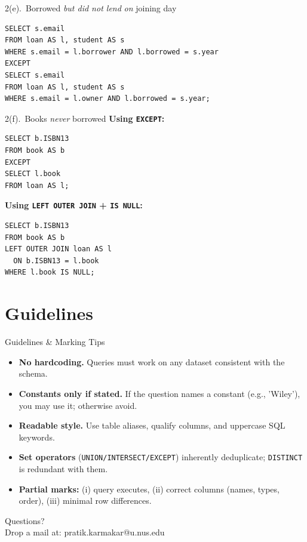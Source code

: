 \documentclass{beamer}
\begin{document}
\begin{frame}[fragile]{2(e).\ Borrowed \emph{but did not lend} \emph{on} joining day}
\small
\begin{lstlisting}
SELECT s.email
FROM loan AS l, student AS s
WHERE s.email = l.borrower AND l.borrowed = s.year
EXCEPT
SELECT s.email
FROM loan AS l, student AS s
WHERE s.email = l.owner AND l.borrowed = s.year;
\end{lstlisting}
\end{frame}

\begin{frame}[fragile]{2(f).\ Books \emph{never} borrowed}
\small
\textbf{Using \texttt{EXCEPT}:}
\begin{lstlisting}
SELECT b.ISBN13
FROM book AS b
EXCEPT
SELECT l.book
FROM loan AS l;
\end{lstlisting}
\textbf{Using \texttt{LEFT OUTER JOIN} + \texttt{IS NULL}:}
\begin{lstlisting}
SELECT b.ISBN13
FROM book AS b
LEFT OUTER JOIN loan AS l
  ON b.ISBN13 = l.book
WHERE l.book IS NULL;
\end{lstlisting}
\end{frame}

\section{Guidelines}
\begin{frame}{Guidelines \& Marking Tips}
\small
\begin{itemize}\itemsep4pt
  \item \textbf{No hardcoding.} Queries must work on any dataset consistent with the schema.
  \item \textbf{Constants only if stated.} If the question names a constant (e.g., 'Wiley'), you may use it; otherwise avoid.
  \item \textbf{Readable style.} Use table aliases, qualify columns, and uppercase SQL keywords.
  \item \textbf{Set operators} (\texttt{UNION/INTERSECT/EXCEPT}) inherently deduplicate; \texttt{DISTINCT} is redundant with them.
  \item \textbf{Partial marks:} (i) query executes, (ii) correct columns (names, types, order), (iii) minimal row differences.
\end{itemize}
\end{frame}

\begin{frame}
\begin{center}
Questions?\\
Drop a mail at: pratik.karmakar@u.nus.edu
\end{center}
\end{frame}
\end{document}
